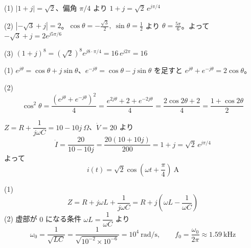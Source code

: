 \documentclass[11pt]{article}
\begin{document}

\problem
\begin{ans}
(1) $|1+j| = \sqrt2$、偏角 $\pi/4$ より $1+j = \sqrt2\, e^{j\pi/4}$

(2) $|-\sqrt3+j| = 2$。$\cos\theta = -\frac{\sqrt3}{2},\ \sin\theta = \frac12$ より $\theta = \frac{5\pi}{6}$。よって $-\sqrt3+j = 2e^{j5\pi/6}$

(3) $(1+j)^8 = (\sqrt2)^8 e^{j8\cdot\pi/4} = 16\,e^{j2\pi} = 16$
\end{ans}

\problem
\begin{ans}
(1) $e^{j\theta} = \cos\theta + j\sin\theta$、$e^{-j\theta} = \cos\theta - j\sin\theta$ を足すと $e^{j\theta}+e^{-j\theta} = 2\cos\theta$。

(2)
\[ \cos^2\theta = \frac{(e^{j\theta}+e^{-j\theta})^2}{4} = \frac{e^{2j\theta} + 2 + e^{-2j\theta}}{4} = \frac{2\cos2\theta + 2}{4} = \frac{1+\cos2\theta}{2} \]
\end{ans}

\problem
\begin{ans}
$Z = R + \dfrac{1}{j\omega C} = 10 - 10j\ \Omega$、$\dot V = 20$ より
\[ \dot I = \frac{20}{10-10j} = \frac{20(10+10j)}{200} = 1 + j = \sqrt2\, e^{j\pi/4} \]
よって
\[ i(t) = \sqrt2\cos\!\left(\omega t + \frac{\pi}{4}\right)\ \mathrm{A} \]
\end{ans}

\problem
\begin{ans}
(1)
\[ Z = R + j\omega L + \frac{1}{j\omega C} = R + j\left(\omega L - \frac{1}{\omega C}\right) \]
(2) 虚部が $0$ になる条件 $\omega L = \dfrac{1}{\omega C}$ より
\[ \omega_0 = \frac{1}{\sqrt{LC}} = \frac{1}{\sqrt{10^{-2}\times10^{-6}}} = 10^4\ \mathrm{rad/s},\qquad f_0 = \frac{\omega_0}{2\pi} \approx 1.59\ \mathrm{kHz} \]
\end{ans}
\end{document}
